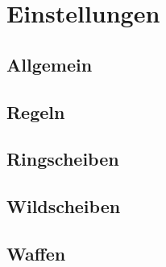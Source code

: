 \chapter{Einstellungen}

\section{Allgemein}

\section{Regeln}

\section{Ringscheiben}

\section{Wildscheiben}

\section{Waffen}
